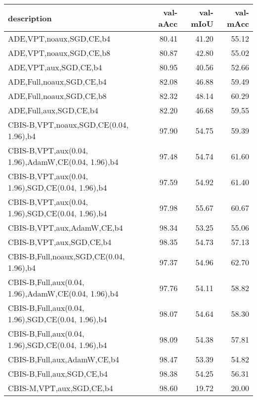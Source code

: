 \begin{tabular}{lrrr}
\toprule
description & val-aAcc & val-mIoU & val-mAcc \\
\midrule
ADE,VPT,noaux,SGD,CE,b4 & 80.41 & 41.20 & 55.12 \\
ADE,VPT,noaux,SGD,CE,b8 & 80.87 & 42.80 & 55.02 \\
ADE,VPT,aux,SGD,CE,b4 & 80.95 & 40.56 & 52.66 \\
ADE,Full,noaux,SGD,CE,b4 & 82.08 & 46.88 & 59.49 \\
ADE,Full,noaux,SGD,CE,b8 & 82.32 & 48.14 & 60.29 \\
ADE,Full,aux,SGD,CE,b4 & 82.20 & 46.68 & 59.55 \\
CBIS-B,VPT,noaux,SGD,CE(0.04, 1.96),b4 & 97.90 & 54.75 & 59.39 \\
CBIS-B,VPT,aux(0.04, 1.96),AdamW,CE(0.04, 1.96),b4 & 97.48 & 54.74 & 61.60 \\
CBIS-B,VPT,aux(0.04, 1.96),SGD,CE(0.04, 1.96),b4 & 97.59 & 54.92 & 61.40 \\
CBIS-B,VPT,aux(0.04, 1.96),SGD,CE(0.04, 1.96),b4 & 97.98 & 55.67 & 60.67 \\
CBIS-B,VPT,aux,AdamW,CE,b4 & 98.34 & 53.25 & 55.06 \\
CBIS-B,VPT,aux,SGD,CE,b4 & 98.35 & 54.73 & 57.13 \\
CBIS-B,Full,noaux,SGD,CE(0.04, 1.96),b4 & 97.37 & 54.96 & 62.70 \\
CBIS-B,Full,aux(0.04, 1.96),AdamW,CE(0.04, 1.96),b4 & 97.76 & 54.11 & 58.82 \\
CBIS-B,Full,aux(0.04, 1.96),SGD,CE(0.04, 1.96),b4 & 98.07 & 54.64 & 58.30 \\
CBIS-B,Full,aux(0.04, 1.96),SGD,CE(0.04, 1.96),b4 & 98.09 & 54.38 & 57.81 \\
CBIS-B,Full,aux,AdamW,CE,b4 & 98.47 & 53.39 & 54.82 \\
CBIS-B,Full,aux,SGD,CE,b4 & 98.38 & 54.25 & 56.31 \\
CBIS-M,VPT,aux,SGD,CE,b4 & 98.60 & 19.72 & 20.00 \\
\bottomrule
\end{tabular}
